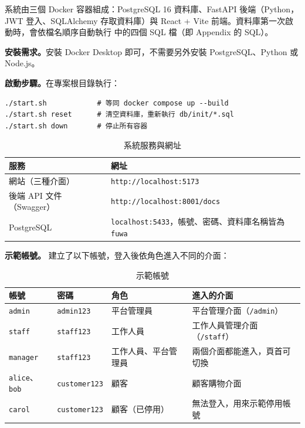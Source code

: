 系統由三個 Docker 容器組成：PostgreSQL 16 資料庫、FastAPI 後端（Python，JWT 登入、SQLAlchemy 存取資料庫）與 React + Vite 前端。資料庫第一次啟動時，會依檔名順序自動執行  中的四個 SQL 檔（即 Appendix 的 SQL）。

\textbf{安裝需求。}安裝 Docker Desktop 即可，不需要另外安裝 PostgreSQL、Python 或 Node.js。

\textbf{啟動步驟。}在專案根目錄執行：
\begin{Verbatim}[fontsize=\small,xleftmargin=2em]
./start.sh            # 等同 docker compose up --build
./start.sh reset      # 清空資料庫，重新執行 db/init/*.sql
./start.sh down       # 停止所有容器
\end{Verbatim}

\begingroup\small
\begin{xltabular}{\linewidth}{|>{\raggedright\arraybackslash}p{4cm}|>{\raggedright\arraybackslash}X|}
\caption{系統服務與網址}\\
\hline{}\textbf{服務} & \textbf{網址}\\\hline\endhead
網站（三種介面） & \texttt{http://localhost:5173}\\\hline
後端 API 文件（Swagger） & \texttt{http://localhost:8001/docs}\\\hline
PostgreSQL & \texttt{localhost:5433}，帳號、密碼、資料庫名稱皆為 \texttt{fuwa}\\\hline
\end{xltabular}
\endgroup

\textbf{示範帳號。} 建立了以下帳號，登入後依角色進入不同的介面：

\begingroup\small
\begin{xltabular}{\linewidth}{|>{\raggedright\arraybackslash}p{2cm}|>{\raggedright\arraybackslash}p{2.4cm}|>{\raggedright\arraybackslash}p{3.4cm}|>{\raggedright\arraybackslash}X|}
\caption{示範帳號}\\
\hline{}\textbf{帳號} & \textbf{密碼} & \textbf{角色} & \textbf{進入的介面}\\\hline\endhead
\texttt{admin} & \texttt{admin123} & 平台管理員 & 平台管理介面（\texttt{/admin}）\\\hline
\texttt{staff} & \texttt{staff123} & 工作人員 & 工作人員管理介面（\texttt{/staff}）\\\hline
\texttt{manager} & \texttt{staff123} & 工作人員、平台管理員 & 兩個介面都能進入，頁首可切換\\\hline
\texttt{alice}、\texttt{bob} & \texttt{customer123} & 顧客 & 顧客購物介面\\\hline
\texttt{carol} & \texttt{customer123} & 顧客（已停用） & 無法登入，用來示範停用帳號\\\hline
\end{xltabular}
\endgroup
